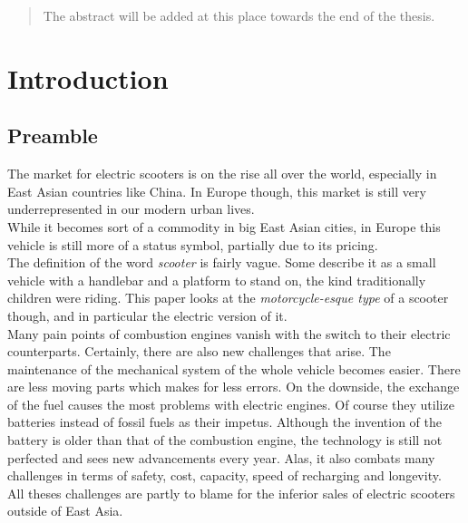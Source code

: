 \documentclass[12pt,a4paper]{report}
\begin{document}



\begin{abstract}

The abstract will be added at this place towards the end of the thesis.

\end{abstract}


\tableofcontents



\chapter{Introduction} \label{chap:intro}


\section{Preamble}

The market for electric scooters is on the rise all over the world,
especially in East Asian countries like China.\cn
In Europe though, this market is still very underrepresented in our modern urban lives.\\
While it becomes sort of a commodity in big East Asian cities, in Europe this vehicle
is still more of a status symbol, partially due to its pricing.\cn \\
The definition of the word \emph{scooter} is fairly vague.
Some describe it as a small vehicle with a handlebar and a platform to stand on,
the kind traditionally children were riding.
This paper looks at the \emph{motorcycle-esque type} of a scooter though, and in
particular the electric version of it.\\
Many pain points of combustion engines vanish with the switch to their electric
counterparts. Certainly, there are also new challenges that arise.
The maintenance of the mechanical system of the whole vehicle becomes easier.
There are less moving parts which makes for less errors.
On the downside, the exchange of the fuel causes the most problems with electric engines.
Of course they utilize batteries instead of fossil fuels as their impetus.
Although the invention of the battery is older than that of the
combustion engine\cn, the technology is still not perfected and sees new
advancements every year. Alas, it also combats many challenges in terms of
safety, cost, capacity, speed of recharging and longevity.\\
All theses challenges are partly to blame for the inferior sales of electric scooters
outside of East Asia.\cn
\end{document}
